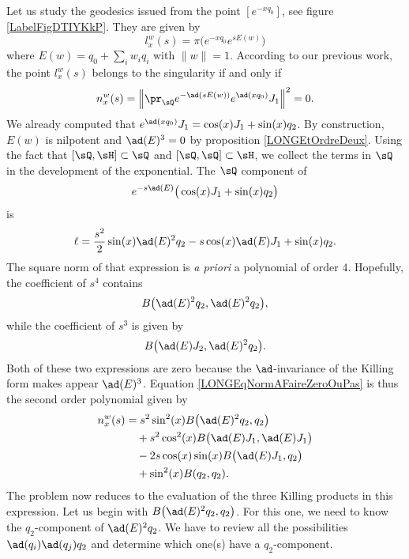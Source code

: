 Let us study the geodesics issued from the point $[ e^{-xq_0}]$, see figure \ref{LabelFigDTIYKkP}. They are given by
\begin{equation}
    l^w_x(s)=\pi\big(    e^{-xq_0} e^{sE(w)} \big)
\end{equation}
where $E(w)=q_0+\sum_iw_iq_i$ with $\| w \|=1$. According to our previous work, the point $l^w_x(s)$ belongs to the singularity if and only if 
\begin{equation}        \label{LONGEqNormAFaireZeroOuPas}
    n_x^w(s)=\left\|   \pr_{\sQ} e^{-\ad(sE(w))} e^{\ad(xq_0)}J_1  \right\|^2=0.
\end{equation}
%
We already computed that $ e^{\ad(xq_0)}J_1=\cos(x)J_1+\sin(x)q_2$. By construction, $E(w)$ is nilpotent and $\ad(E)^3=0$ by proposition \ref{LONGEtOrdreDeux}. Using the fact that $[\sQ,\sH]\subset\sQ$ and $[\sQ,\sQ]\subset\sH$, we collect the terms in $\sQ$ in the development of the exponential. The $\sQ$ component of
\begin{equation}
    e^{-s\ad(E)}\big( \cos(x)J_1+\sin(x)q_2 \big)
\end{equation}
is 
\begin{equation}
    \ell=\frac{ s^2 }{ 2 }\sin(x)\ad(E)^2q_2-s\cos(x)\ad(E)J_1+\sin(x)q_2.
\end{equation}
The square norm of that expression is \emph{a priori} a polynomial of order $4$. Hopefully, the coefficient of $s^4$ contains
\begin{equation}
    B\big( \ad(E)^2q_2,\ad(E)^2q_2 \big),
\end{equation}
while the coefficient of $s^3$ is given by
\begin{equation}
    B\big( \ad(E)J_2,\ad(E)^2q_2 \big).
\end{equation}
Both of these two expressions are zero because the $\ad$-invariance of the Killing form makes appear $\ad(E)^3$. Equation \eqref{LONGEqNormAFaireZeroOuPas} is thus the second order polynomial given by
%
%
\begin{equation}        \label{LONGEqnwxBBB}
    \begin{aligned}[]
        n_x^w(s)    &=s^2\sin^2(x)B\big( \ad(E)^2q_2,q_2 \big)\\
                &\quad+s^2\cos^2(x)B\big( \ad(E)J_1,\ad(E) J_1\big)\\
                &\quad-2s\cos(x)\sin(x)B\big( \ad(E)J_1,q_2 \big)\\
                &\quad+\sin^2(x)B(q_2,q_2).
    \end{aligned}
\end{equation}
The problem now reduces to the evaluation of the three Killing products in this expression. %
%
Let us begin with $B\big( \ad(E)^2q_2,q_2 \big)$. For this one, we need to know the $q_2$-component of $\ad(E)^2q_2$. We have to review all the possibilities $\ad(q_i)\ad(q_j)q_2$ and determine which one(s) have a $q_2$-component.


